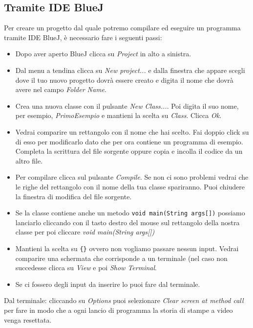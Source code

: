 \documentclass{article}
\begin{document}
\subsection{Tramite IDE BlueJ}
\noindent Per creare un progetto dal quale potremo compilare ed eseguire un programma tramite IDE BlueJ, è necessario fare i seguenti passi:
\begin{itemize}
\item Dopo aver aperto BlueJ clicca su \textit{Project} in alto a sinistra. 
\item Dal menu a tendina clicca su \textit{New project...} e dalla finestra che appare scegli dove il tuo nuovo progetto dovrà essere creato e digita il nome che dovrà avere nel campo \textit{Folder Name}.
\item Crea una nuova classe con il pulsante \textit{New Class...}. Poi digita il suo nome, per esempio, \textit{PrimoEsempio} e mantieni la scelta su \textit{Class}. Clicca \textit{Ok}.
\item Vedrai comparire un rettangolo con il nome che hai scelto. Fai doppio click su di esso per modificarlo dato che per ora contiene un programma di esempio. Completa la scrittura del file sorgente oppure copia e incolla il codice da un altro file.
\item Per compilare clicca sul pulsante \textit{Compile}. Se non ci sono problemi vedrai che le righe del rettangolo con il nome della tua classe spariranno. Puoi chiudere la finestra di modifica del file sorgente.
\item Se la classe contiene anche un metodo \texttt{void main(String args[])} possiamo lanciarlo cliccando con il tasto destro del mouse sul rettangolo della nostra classe per poi cliccare \textit{void main(String args[])} 
\item Mantieni la scelta su \texttt{\{\}} ovvero non vogliamo passare nessun input. Vedrai comparire una schermata che corrisponde a un terminale (nel caso non succedesse clicca su \textit{View} e poi \textit{Show Terminal}.
\item Se ci fossero degli input da inserire lo puoi fare dal terminale.
\end{itemize}
Dal terminale: cliccando su \textit{Options} puoi selezionare \textit{Clear screen at method call} per fare in modo che a ogni lancio di programma la storia di stampe a video venga resettata.
\end{document}
